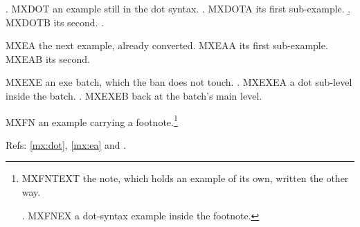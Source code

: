 

\ex.\label{mx:dot} MXDOT an example still in the dot syntax.
\a. MXDOTA its first sub-example.
\b. MXDOTB its second.
\z.

\ea\label{mx:ea} MXEA the next example, already converted.
  \ea MXEAA its first sub-example.
  \ex MXEAB its second.
  \z
\z

\begin{exe}
\ex MXEXE an exe batch, which the ban does not touch.
\a. MXEXEA a dot sub-level inside the batch.
\z.
\ex MXEXEB back at the batch's main level.
\end{exe}

\ea MXFN an example carrying a footnote.\footnote{MXFNTEXT the note, which
holds an example of its own, written the other way.

\ex. MXFNEX a dot-syntax example inside the footnote.

}
\z

Refs: \ref{mx:dot}, \ref{mx:ea} and \Last.

